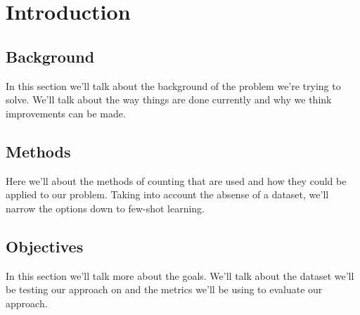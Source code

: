 
\chapter{Introduction}

\section{Background}
In this section we'll talk about the background of the problem we're trying to solve. 
We'll talk about the way things are done currently and why we think improvements can be made.

\section{Methods}
Here we'll about the methods of counting that are used and how they could be applied to our problem.
Taking into account the absense of a dataset, we'll narrow the options down to few-shot learning.

\section{Objectives}
In this section we'll talk more about the goals.
We'll talk about the dataset we'll be testing our approach on and 
the metrics we'll be using to evaluate our approach.
